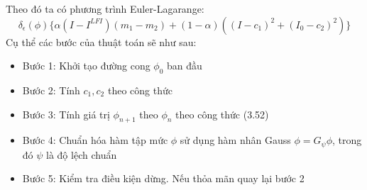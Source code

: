 \documentclass[14pt,oneside,a4paper]{extreport}
\begin{document}
Theo đó ta có phương trình Euler-Lagarange:
\begin{equation*}
\delta_{\epsilon}(\phi)\{\alpha(I-I^{LFI})(m_1-m_2)+(1-\alpha)((I-c_1)^2+ (I_0-c_2)^2)\}
\end{equation*}
Cụ thể các bước của thuật toán sẽ như sau:
\begin{itemize}
\item Bước 1: Khởi tạo đường cong $\phi_0$ ban đầu
\item Bước 2: Tính $c_1, c_2$ theo công thức 
\item Bước 3: Tính giá trị $\phi_{n+1}$ theo $\phi_{n}$ theo công thức (3.52)
\item Bước 4: Chuẩn hóa hàm tập mức $\phi$ sử dụng hàm nhân Gauss $\phi=G_{\psi}\phi$, trong đó $\psi$ là độ lệch chuẩn
\item Bước 5: Kiểm tra điều kiện dừng. Nếu thỏa mãn quay lại bước 2
\end{itemize}
\end{document}
